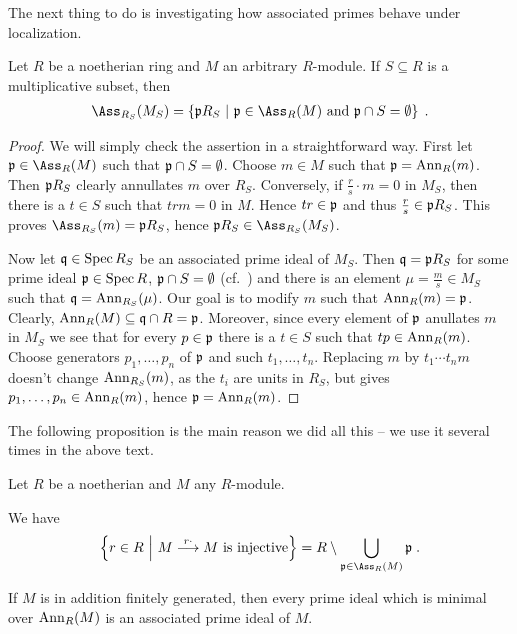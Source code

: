 \documentclass[a4paper,parskip=half,numbers=enddot, DIV=12]{scrreprt}
\begin{document}
The next thing to do is investigating how associated primes behave under localization.
\begin{prop}
	Let $R$ be a noetherian ring and $M$ an arbitrary $R$-module. If $S\subseteq R$ is a multiplicative subset, then
	\begin{align*}
		\Ass_{R_S}(M_S)=\left\{\pp R_S\st \pp\in\Ass_R(M)\text{ and }\pp\cap S=\emptyset\right\}\;.
	\end{align*}
\end{prop}
\begin{proof}
	We will simply check the assertion in a straightforward way. First let $\pp\in\Ass_R(M)$ such that $\mathfrak{p}\cap S=\emptyset$. Choose $m\in M$ such that $\mathfrak{p}=\operatorname{Ann}_R(m)$. Then $\mathfrak{p} R_S$ clearly annullates $m$ over $R_S$. Conversely, if $\frac{r}{s}\cdot m=0$ in $M_S$, then there is a $t\in S$ such that $trm=0$ in $M$. Hence $tr\in\mathfrak{p}$ and thus $\frac{r}{s}\in\mathfrak{p} R_S$. This proves $\Ass_{R_S}(m)=\pp R_S$, hence $\pp R_S\in\Ass_{R_S}(M_S)$.
	
	Now let $\mathfrak{q}\in\operatorname{Spec} R_S$ be an associated prime ideal of $M_S$. Then $\mathfrak{q}=\mathfrak{p} R_S$ for some prime ideal $\mathfrak{p}\in\operatorname{Spec} R$, $\mathfrak{p}\cap S=\emptyset$ (cf.\ \cite[Corollary~2.3.1]{alg1}) and there is an element $\mu=\frac{m}{s}\in M_S$ such that $\mathfrak{q}=\operatorname{Ann}_{R_S}(\mu)$. Our goal is to modify $m$ such that $\operatorname{Ann}_R(m)=\mathfrak{p}$. Clearly, $\operatorname{Ann}_R(M)\subseteq \mathfrak{q}\cap R=\mathfrak{p}$. Moreover, since every element of $\mathfrak{p}$ anullates $m$ in $M_S$ we see that for every $p\in\mathfrak{p}$ there is a $t\in S$ such that $tp\in\operatorname{Ann}_R(m)$. Choose generators $p_1,\ldots,p_n$ of $\mathfrak{p}$ and such $t_1,\ldots,t_n$. Replacing $m$ by $t_1\cdots t_nm$ doesn't change $\operatorname{Ann}_{R_S}(m)$, as the $t_i$ are units in $R_S$, but gives $p_1,\ldots,p_n\in\operatorname{Ann}_R(m)$, hence $\mathfrak{p}=\operatorname{Ann}_R(m)$.
\end{proof}
The following proposition is the main reason we did all this -- we use it several times in the above text.
\begin{prop}
	Let $R$ be a noetherian and $M$ any $R$-module.
	\begin{alphanumerate}
		\item We have
		\begin{align*}
			\left\{r\in R\st M\morphism[r\cdot ]M\text{ is injective}\right\}=R\setminus\bigcup_{\pp\in \Ass_R(M)}\pp\;.
		\end{align*}
		\item If $M$ is in addition finitely generated, then every prime ideal which is minimal over $\operatorname{Ann}_R(M)$ is an associated prime ideal of $M$.
	\end{alphanumerate}
\end{prop}
\end{document}
